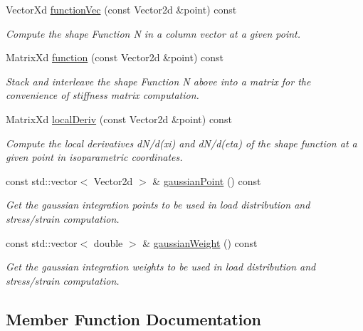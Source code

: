 \begin{DoxyCompactItemize}
\item 
Vector\+Xd \mbox{\hyperlink{class_shape_q8_a7e2de42658deff3c6912cc102b12cc96}{function\+Vec}} (const Vector2d \&point) const
\begin{DoxyCompactList}\small\item\em Compute the shape Function N in a column vector at a given point. \end{DoxyCompactList}\item 
Matrix\+Xd \mbox{\hyperlink{class_shape_q8_a7e859a85ee52c8d3ab3051326fc09ab0}{function}} (const Vector2d \&point) const
\begin{DoxyCompactList}\small\item\em Stack and interleave the shape Function N above into a matrix for the convenience of stiffness matrix computation. \end{DoxyCompactList}\item 
Matrix\+Xd \mbox{\hyperlink{class_shape_q8_ac62182e6804216500c2b290efd5fd06a}{local\+Deriv}} (const Vector2d \&point) const
\begin{DoxyCompactList}\small\item\em Compute the local derivatives d\+N/d(xi) and d\+N/d(eta) of the shape function at a given point in isoparametric coordinates. \end{DoxyCompactList}\item 
const std\+::vector$<$ Vector2d $>$ \& \mbox{\hyperlink{class_shape_q8_a197f1e2109c7ee6c29d27198c96928a4}{gaussian\+Point}} () const
\begin{DoxyCompactList}\small\item\em Get the gaussian integration points to be used in load distribution and stress/strain computation. \end{DoxyCompactList}\item 
const std\+::vector$<$ double $>$ \& \mbox{\hyperlink{class_shape_q8_a30891417d7ba6d6457b8b5567add07f5}{gaussian\+Weight}} () const
\begin{DoxyCompactList}\small\item\em Get the gaussian integration weights to be used in load distribution and stress/strain computation. \end{DoxyCompactList}\end{DoxyCompactItemize}


\subsection{Member Function Documentation}
\mbox{\label{class_shape_q8_a7e859a85ee52c8d3ab3051326fc09ab0}} 
